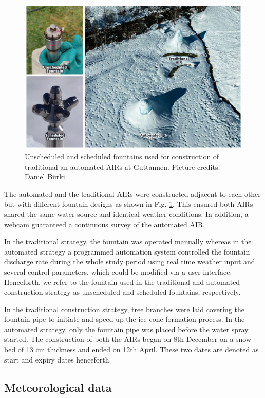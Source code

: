 \documentclass[tc, manuscript]{copernicus}
\begin{document}
\begin{figure}[t]
\includegraphics[width=12cm]{Figures/AIR_fountains.jpg}
\caption{Unscheduled and scheduled fountains used for construction of traditional an automated AIRs at Guttannen. Picture credits: Daniel Bürki}
\label{fig:2AIR}
\end{figure}

The automated and the traditional AIRs were constructed adjacent to each other but with different fountain
designs as shown in Fig. \ref{fig:2AIR}. This ensured both AIRs shared the same water source and identical
weather conditions. In addition, a webcam guaranteed a continuous survey of the automated AIR.   

In the traditional strategy, the fountain was operated manually whereas in the automated strategy a programmed
automation system controlled the fountain discharge rate during the whole study period using real time weather
input and several control parameters, which could be modified via a user interface. Henceforth, we refer to the
fountain used in the traditional and automated construction strategy as unscheduled and scheduled fountains,
respectively.

In the traditional construction strategy, tree branches were laid covering the fountain pipe to initiate and
speed up the ice cone formation process. In the automated strategy, only the fountain pipe was placed before the
water spray started. The construction of both the AIRs began on 8th December on a snow bed of 13 cm thickness
and ended on 12th April. These two dates are denoted as start and expiry dates henceforth.

\subsection{Meteorological data}
\end{document}
